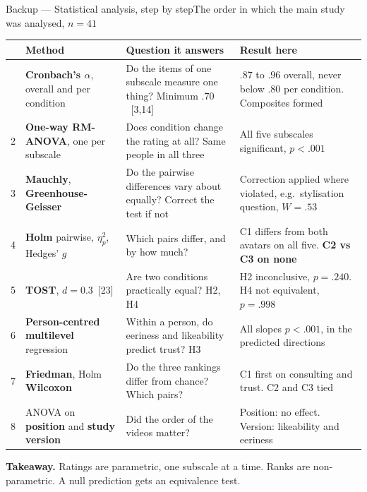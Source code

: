 \documentclass[aspectratio=169,10pt]{beamer}
\newcommand{\hl}[1]{{\color{knblue}\textbf{#1}}}
\newcommand{\bad}[1]{{\color{knred}\textbf{#1}}}
\newcommand{\rowrule}{\noalign{\vskip1pt}\arrayrulecolor{black!12}\hline\arrayrulecolor{black}\noalign{\vskip1pt}}
\newcommand{\takeaway}[1]{%
  \vfill
  \noindent\colorbox{knlight}{\parbox{0.975\textwidth}{\small\color{knblue}\textbf{Takeaway.} #1}}%
  \vspace{0.2em}}
\begin{document}
\begin{frame}{Backup — Statistical analysis, step by step}{The order in which the main study was analysed, $n=41$}
  \vspace{-0.4em}
  {\scriptsize\setlength{\tabcolsep}{3pt}\renewcommand{\arraystretch}{1.05}
  \begin{tabular}{@{}>{\raggedright\arraybackslash}m{}>{\raggedright\arraybackslash}m{}>{\raggedright\arraybackslash}m{}>{\raggedright\arraybackslash}m{}@{}}
    \toprule
    & \textbf{Method} & \textbf{Question it answers} & \textbf{Result here} \\
    \midrule
    1 & \hl{Cronbach's $\alpha$}, overall and per condition & Do the items of one subscale measure one thing? Minimum $.70$~[3,14] & $.87$ to $.96$ overall, never below $.80$ per condition. Composites formed \\
    \rowrule
    2 & \hl{One-way RM-ANOVA}, one per subscale & Does condition change the rating at all? Same people in all three & All five subscales significant, $p<.001$ \\
    \rowrule
    3 & \hl{Mauchly}, \hl{Greenhouse-Geisser} & Do the pairwise differences vary about equally? Correct the test if not & Correction applied where violated, e.g.\ stylisation question, $W=.53$ \\
    \rowrule
    4 & \hl{Holm} pairwise, $\eta^2_p$, Hedges' $g$ & Which pairs differ, and by how much? & C1 differs from both avatars on all five. \bad{C2 vs C3 on none} \\
    \rowrule
    5 & \hl{TOST}, $d=0.3$~[23] & Are two conditions practically equal? H2, H4 & H2 inconclusive, $p=.240$. H4 not equivalent, $p=.998$ \\
    \rowrule
    6 & \hl{Person-centred multilevel} regression & Within a person, do eeriness and likeability predict trust? H3 & All slopes $p<.001$, in the predicted directions \\
    \rowrule
    7 & \hl{Friedman}, Holm \hl{Wilcoxon} & Do the three rankings differ from chance? Which pairs? & C1 first on consulting and trust. C2 and C3 tied \\
    \rowrule
    8 & ANOVA on \hl{position} and \hl{study version} & Did the order of the videos matter? & Position: no effect. Version: likeability and eeriness \\
    \bottomrule
  \end{tabular}\par}
  \takeaway{Ratings are parametric, one subscale at a time. Ranks are non-parametric. A null prediction gets an equivalence test.}
\end{frame}
\end{document}
